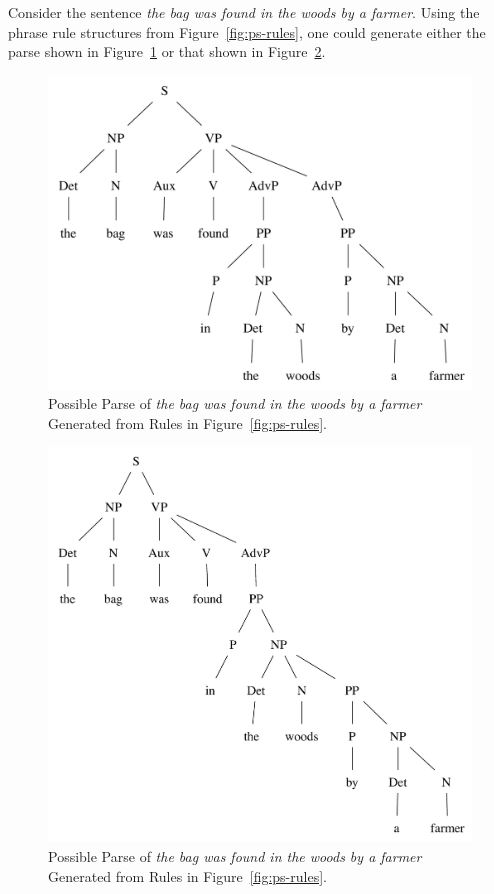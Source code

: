 \documentclass[main.tex]{subfiles}
\begin{document}
Consider the sentence \textit{the bag was found in the woods by a farmer}. Using the phrase rule structures from Figure~\ref{fig:ps-rules}, one could generate either the parse shown in Figure~\ref{fig:ps-tree-ambig1} or that shown in Figure~\ref{fig:ps-tree-ambig2}. 
\begin{figure}[htbp]
\centering
\includegraphics[scale=0.6]{ps-tree-ambig1.pdf}
\caption{Possible Parse of \textit{the bag was found in the woods by a farmer} Generated from Rules in Figure~\ref{fig:ps-rules}.}
\label{fig:ps-tree-ambig1}
\end{figure}
\begin{figure}[htbp]
\centering
\includegraphics[scale=0.6]{ps-tree-ambig2.pdf}
\caption{Possible Parse of \textit{the bag was found in the woods by a farmer} Generated from Rules in Figure~\ref{fig:ps-rules}.}
\label{fig:ps-tree-ambig2}
\end{figure}
\end{document}

